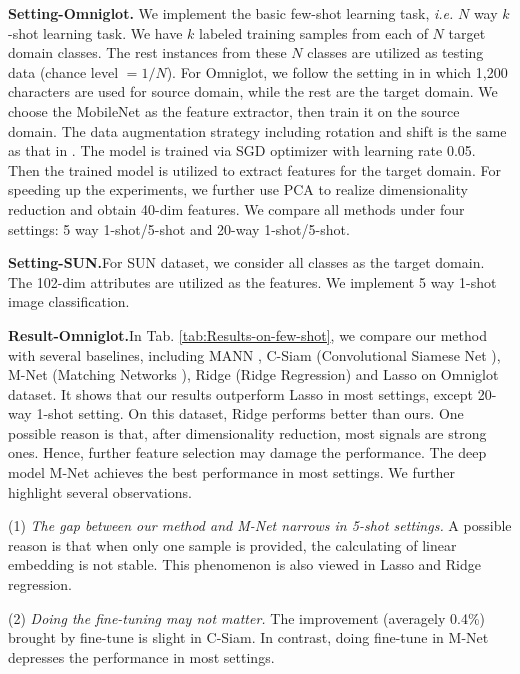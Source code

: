 \documentclass{article}
\begin{document}
\noindent \textbf{Setting-Omniglot.}{ We implement the basic few-shot learning task, \emph{i.e.}
$N$ way $k$-shot learning task. We have $k$ labeled training samples from
each of $N$ target domain classes. The rest instances from these
$N$ classes are utilized as testing data  {(chance level $= 1/N$).}
For Omniglot, we  follow the setting in \citet{matchingnet_1shot} in which 1,200 characters
are used for source domain, while the rest are the target domain.
We choose the MobileNet \citet{howard2017mobilenets} as the feature extractor,
then train it on the source domain. The data augmentation strategy
including rotation and shift is the same as that in \citet{matchingnet_1shot}.
The model is trained via SGD optimizer with learning rate 0.05. Then
the trained model is utilized to extract features for the target domain.
For speeding up the experiments, we further use PCA \cite{bishop1999vpca} to realize dimensionality reduction and obtain 40-dim features.
We compare all methods under four settings: 5 way 1-shot/5-shot
and 20-way 1-shot/5-shot.
}


\noindent \textbf{Setting-SUN.}{For SUN dataset, we consider all classes as the target domain. The 102-dim attributes are
utilized as the features. We implement 5 way 1-shot image classification.}






\noindent \textbf{Result-Omniglot.}{In Tab. \ref{tab:Results-on-few-shot}, we compare our method with
several baselines, including MANN \citet{santoro2016meta}, C-Siam (Convolutional Siamese
Net \citet{siamese_1shot}), M-Net (Matching Networks \citet{matchingnet_1shot}),
Ridge (Ridge Regression) and Lasso on Omniglot dataset. It shows that our results outperform Lasso in most settings, except 20-way 1-shot setting. On this dataset, Ridge performs better than ours. One possible reason is that, after dimensionality reduction, most signals are strong ones. Hence, further feature selection may damage the performance. The deep model M-Net achieves the best performance in most settings. We further highlight several observations.}


\noindent (1) \emph{The gap between our method and M-Net narrows in 5-shot settings.}
A possible reason is that when only one sample is provided, the calculating of linear embedding is not stable. This phenomenon is also viewed in Lasso and Ridge regression.


\noindent (2) \emph{Doing the fine-tuning may not matter.}
The improvement (averagely 0.4\%) brought by fine-tune is slight in C-Siam. In contrast, doing fine-tune in M-Net depresses the performance in most settings.
\end{document}
